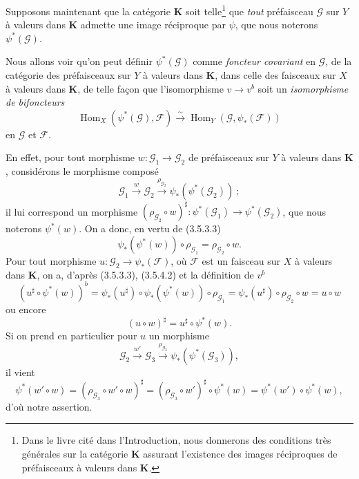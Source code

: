 
\begin{env}[3.5.4]
\label{0.3.5.4-fr}
Supposons maintenant que la catégorie $\mathbf{K}$ soit telle\footnote{Dans
le livre cité dans l'Introduction, nous donnerons des conditions très
générales sur la catégorie $\mathbf{K}$ assurant l'existence des images
réciproques de préfaisceaux à valeurs dans $\mathbf{K}$.} que \emph{tout}
préfaisceau $\mathcal{G}$ sur $Y$ à valeurs dans $\mathbf{K}$ admette une
image réciproque par $\psi$, que nous noterons $\psi^*(\mathcal{G})$.

Nous allons voir qu'on peut définir $\psi^*(\mathcal{G})$ comme \emph{foncteur
covariant} en $\mathcal{G}$, de la catégorie des préfaisceaux sur $Y$ à
valeurs dans $\mathbf{K}$, dans celle des faisceaux sur $X$ à valeurs dans
$\mathbf{K}$, de telle façon que l'isomorphisme $v\to v^b$ soit un
\emph{isomorphisme de bifoncteurs}
\begin{equation*}
  \operatorname{Hom}_X(\psi^*(\mathcal{G}),\mathcal{F})
  \xrightarrow{\sim}
  \operatorname{Hom}_Y(\mathcal{G},\psi_*(\mathcal{F}))
\tag{3.5.4.1}\label{0.3.5.4.1-fr}
\end{equation*}
en $\mathcal{G}$ et $\mathcal{F}$.

En effet, pour tout morphisme
$w:\mathcal{G}_1\to\mathcal{G}_2$ de préfaisceaux sur $Y$ à valeurs dans
$\mathbf{K}$, considérons le morphisme composé
\[
  \mathcal{G}_1\xrightarrow{w}\mathcal{G}_2
  \xrightarrow{\rho_{\mathcal{G}_2}}
  \psi_*(\psi^*(\mathcal{G}_2))~;
\]
il lui correspond un morphisme
$(\rho_{\mathcal{G}_2}\circ w)^\sharp:
\psi^*(\mathcal{G}_1)\to\psi^*(\mathcal{G}_2)$, que nous noterons
$\psi^*(w)$. On a donc, en vertu de (3.5.3.3)
\begin{equation*}
  \psi_*(\psi^*(w))\circ\rho_{\mathcal{G}_1}
  =\rho_{\mathcal{G}_2}\circ w.
\tag{3.5.4.2}\label{0.3.5.4.2-fr}
\end{equation*}
Pour tout morphisme $u:\mathcal{G}_2\to\psi_*(\mathcal{F})$, où
$\mathcal{F}$ est un faisceau sur $X$ à valeurs dans $\mathbf{K}$, on a,
d'après (3.5.3.3), (3.5.4.2) et la définition de $v^b$
\[
  (u^\sharp\circ\psi^*(w))^b
  =\psi_*(u^\sharp)\circ\psi_*(\psi^*(w))\circ\rho_{\mathcal{G}_1}
  =\psi_*(u^\sharp)\circ\rho_{\mathcal{G}_2}\circ w
  =u\circ w
\]
ou encore
\begin{equation*}
  (u\circ w)^\sharp=u^\sharp\circ\psi^*(w).
\tag{3.5.4.3}\label{0.3.5.4.3-fr}
\end{equation*}
Si on prend en particulier pour $u$ un morphisme
\[
  \mathcal{G}_2\xrightarrow{w'}\mathcal{G}_3
  \xrightarrow{\rho_{\mathcal{G}_3}}
  \psi_*(\psi^*(\mathcal{G}_3)),
\]
il vient
\[
  \psi^*(w'\circ w)
  =(\rho_{\mathcal{G}_3}\circ w'\circ w)^\sharp
  =(\rho_{\mathcal{G}_3}\circ w')^\sharp\circ\psi^*(w)
  =\psi^*(w')\circ\psi^*(w),
\]
d'où notre assertion.


\end{env}
